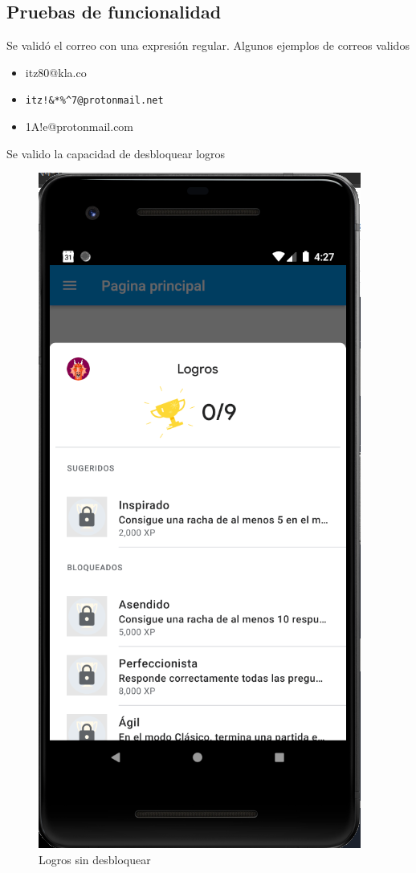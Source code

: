 \documentclass{article}
\begin{document}
\subsection{Pruebas de funcionalidad}
Se validó el correo con una expresión regular. Algunos ejemplos de correos validos
\begin{itemize}
	\item itz80@kla.co
	\item \verb |itz!&*%
	\item 1A!e@protonmail.com
\end{itemize}
Se valido la capacidad de desbloquear logros
\begin{figure}[H]
    \centering
    \includegraphics[scale=0.8]{imgs/Imp/Logros}
    \caption{Logros sin desbloquear}
\end{figure}
\end{document}
